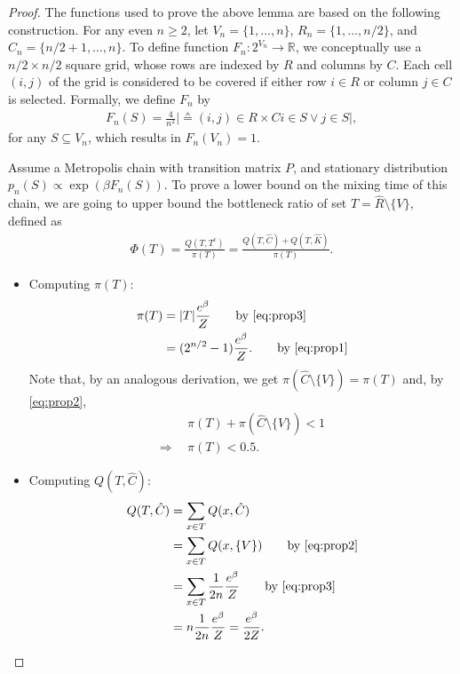 \begin{proof}
The functions used to prove the above lemma are based on the following construction.
For any even $n \geq 2$, let $V_n = \{1,\ldots,n\}$, $R_n = \{1,\ldots,n/2\}$, and $C_n = \{n/2+1,\ldots,n\}$.
To define function $F_n : 2^{V_n} \to \mathbb{R}$, we conceptually use a $n/2 \times n/2$ square grid, whose rows are indexed by $R$ and columns by $C$.
Each cell $(i, j)$ of the grid is considered to be covered if either row $i \in R$ or column $j \in C$ is selected.
Formally, we define $F_n$ by
\begin{align*}
  F_n(S) = \frac{4}{n^2}\big\vert \sdef{(i, j) \in R \times C}{i \in S \lor j \in S}\big\vert,
\end{align*}
for any $S \subseteq V_n$, which results in $F_n(V_n) = 1$.

Assume a Metropolis chain with transition matrix $P$, and stationary distribution $p_n(S) \propto \exp(\beta F_n(S))$.
To prove a lower bound on the mixing time of this chain, we are going to upper bound the bottleneck ratio of set $T = \hat{R} \setminus \{V\}$, defined as
\begin{align*}
  \Phi(T) = \frac{Q(T, T^c)}{\pi(T)} = \frac{Q(T, \hat{C}) + Q(T, \hat{K})}{\pi(T)}.
\end{align*}

\begin{itemize}
  \item Computing $\pi(T)$:
    \begin{align*}
      \pi(T) &= |T| \frac{e^{\beta}}{Z} \tag*{by \eqref{eq:prop3}} \\
             &= (2^{n/2} - 1) \frac{e^{\beta}}{Z}. \tag*{by \eqref{eq:prop1}}
    \end{align*}
    Note that, by an analogous derivation, we get $\pi(\hat{C} \setminus \{V\}) = \pi(T)$ and, by \eqref{eq:prop2},
    \begin{align*}
      &\pi(T) + \pi(\hat{C} \setminus \{V\}) < 1 \\
      \Rightarrow\ \ &\pi(T) < 0.5.
    \end{align*}
  
  \item Computing $Q(T, \hat{C})$:
    \begin{align*}
      Q(T, \hat{C}) &= \sum_{x \in T} Q(x, \hat{C}) \\
                    &= \sum_{x \in T} Q(x, \{V\}) \tag*{by \eqref{eq:prop2}} \\
                    &= \sum_{x \in T} \frac{1}{2n} \frac{e^{\beta}}{Z} \tag*{by \eqref{eq:prop3}} \\
                    &= n \frac{1}{2n} \frac{e^{\beta}}{Z} = \frac{e^{\beta}}{2Z}.
    \end{align*}
    

\end{itemize}
\end{proof}
